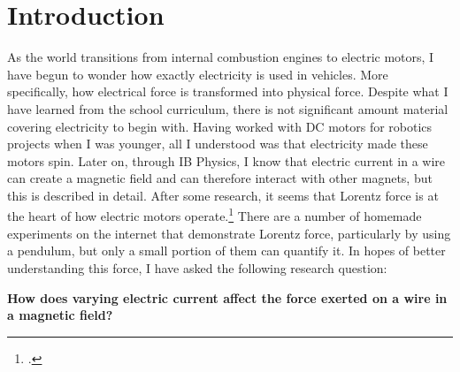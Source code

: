 \section*{Introduction}

As the world transitions from internal combustion engines to electric motors, I have begun to wonder how exactly electricity is used in vehicles.
More specifically, how electrical force is transformed into physical force.
Despite what I have learned from the school curriculum, there is not significant amount material covering electricity to begin with.
Having worked with DC motors for robotics projects when I was younger, all I understood was that electricity made these motors spin.
Later on, through IB Physics, I know that electric current in a wire can create a magnetic field and can therefore interact with other magnets, but this is described in detail.
After some research, it seems that Lorentz force is at the heart of how electric motors operate.\footcite{kramer2}
There are a number of homemade experiments on the internet that demonstrate Lorentz force, particularly by using a pendulum,
but only a small portion of them can quantify it.
In hopes of better understanding this force, I have asked the following research question:

\textbf{How does varying electric current affect the force exerted on a wire in a magnetic field?}
